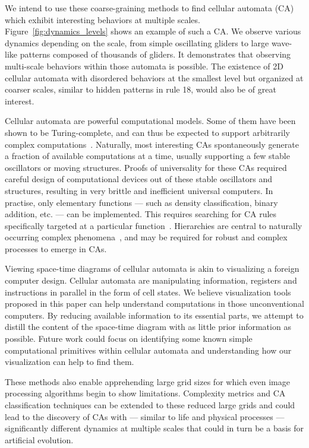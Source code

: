 We intend to use these coarse-graining methods to find cellular automata (CA) which
exhibit interesting behaviors at multiple scales.
Figure~\ref{fig:dynamics_levels} shows an example of such a CA\@. We observe
various dynamics depending on the scale, from simple oscillating gliders to
large wave-like patterns composed of thousands of gliders. It demonstrates that
observing multi-scale behaviors within those automata is possible. The existence
of 2D cellular automata with disordered behaviors at the smallest level but
organized at coarser scales, similar to hidden patterns in rule 18, would also
be of great interest.

Cellular automata are powerful computational models. Some of them have been
shown to be Turing-complete, and can thus be expected to support arbitrarily
complex computations~\cite{berlekampWinningWaysYour2001,
  cookUniversalityElementaryCellular2004}. Naturally, most interesting CAs
spontaneously generate a fraction of available computations at a time, usually
supporting a few stable oscillators or moving structures. Proofs of universality
for these CAs required careful design of computational devices out of these
stable oscillators and structures, resulting in very brittle and inefficient
universal computers. In practise, only elementary functions --- such as density
classification, binary addition, etc. --- can be implemented. This requires
searching for CA rules specifically targeted at a particular
function~\cite{mitchellEvolvingCellularAutomata1996, wolframNewKindScience2002,
  sapinResearchCellularAutomaton2003}. Hierarchies are central to naturally
occurring complex phenomena~\cite{simonArchitectureComplexity1962}, and may be
required for robust and complex processes to emerge in CAs.

Viewing space-time diagrams of cellular automata is akin to visualizing a
foreign computer design. Cellular automata are manipulating information,
registers and instructions in parallel in the form of cell states. We believe
visualization tools proposed in this paper can help understand computations in
those unconventional computers. By reducing available information to its
essential parts, we attempt to distill the content of the space-time diagram
with as little prior information as possible. Future work could focus on
identifying some known simple computational primitives within cellular automata
and understanding how our visualization can help to find them.

These methods also enable apprehending large grid sizes for which even image
processing algorithms begin to show limitations. Complexity metrics and CA
classification techniques can be extended to these reduced large grids and could
lead to the discovery of CAs with --- similar to life and physical processes ---
significantly different dynamics at multiple scales that could in turn be a
basis for artificial evolution.
